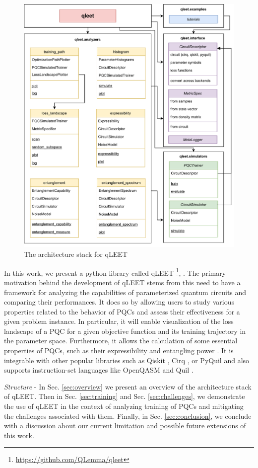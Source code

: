 \begin{figure}[!th]
    \centering
    \includegraphics[width=0.61\linewidth]{figures/qleet/qleet-architecture.pdf}
    \caption{The architecture stack for qLEET}
    \label{fig:qleet-architecture}
\end{figure}

In this work, we present a python library called qLEET \footnote{\href{https://github.com/QLemma/qleet}{https://github.com/QLemma/qleet}}, \cite{qleet-zenodo}. The primary motivation behind the development of qLEET stems from this need to have a framework for analyzing the capabilities of parameterized quantum circuits and comparing their performances. It does so by allowing users to study various properties related to the behavior of PQCs and assess their effectiveness for a given problem instance. In particular, it will enable visualization of the loss landscape of a PQC for a given objective function and its training trajectory in the parameter space. Furthermore, it allows the calculation of some essential properties of PQCs, such as their expressibility and entangling power \cite{expressibility-entanglability-guzik}. It is integrable with other popular libraries such as Qiskit \cite{comp_qiskit}, Cirq \cite{comp_cirq}, or PyQuil \cite{ccquad_Pyquil} and also supports instruction-set languages like OpenQASM \cite{2021arXiv210414722C} and Quil \cite{ccquad_Pyquil}.

\textit{Structure} - In Sec. \ref{sec:overview} we present an overview of the architecture stack of qLEET. Then in Sec. \ref{sec:training} and Sec. \ref{sec:challenges}, we demonstrate the use of qLEET in the context of analyzing training of PQCs and mitigating the challenges associated with them. Finally, in Sec. \ref{sec:conclusion}, we conclude with a discussion about our current limitation and possible future extensions of this work.

